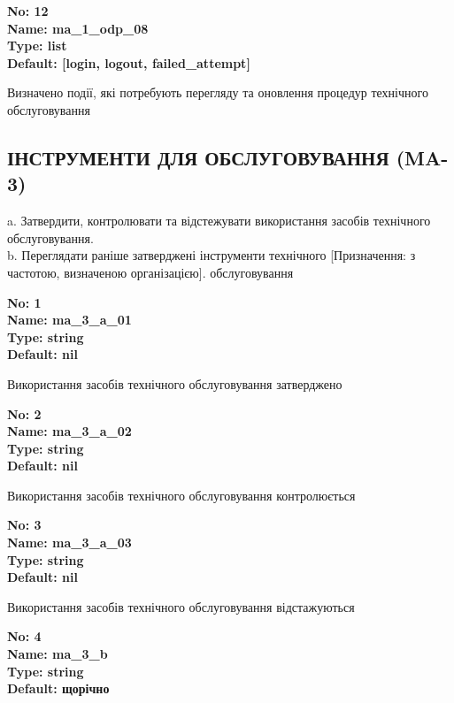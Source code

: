 \documentclass{article}
\begin{document}
{\footnotesize\bfseries
No: 12\\
Name: ma\_\allowbreak{}1\_\allowbreak{}odp\_\allowbreak{}08\\
Type: list\\
Default: [\textquotedbl{}login\textquotedbl{}, \textquotedbl{}logout\textquotedbl{}, \textquotedbl{}failed\_\allowbreak{}attempt\textquotedbl{}]
}

{\footnotesize Визначено події, які потребують перегляду та оновлення процедур технічного обслуговування}




\subsection{ІНСТРУМЕНТИ ДЛЯ ОБСЛУГОВУВАННЯ (MA-3)}
a. Затвердити, контролювати та відстежувати використання засобів технічного обслуговування.\\ 
b. Переглядати раніше затверджені інструменти технічного [Призначення: з частотою, визначеною організацією]. обслуговування

\vspace{10pt}
{\footnotesize\bfseries
No: 1\\
Name: ma\_\allowbreak{}3\_\allowbreak{}a\_\allowbreak{}01\\
Type: string\\
Default: nil
}

{\footnotesize Використання засобів технічного обслуговування затверджено}


{\footnotesize\bfseries
No: 2\\
Name: ma\_\allowbreak{}3\_\allowbreak{}a\_\allowbreak{}02\\
Type: string\\
Default: nil
}

{\footnotesize Використання засобів технічного обслуговування контролюється}


{\footnotesize\bfseries
No: 3\\
Name: ma\_\allowbreak{}3\_\allowbreak{}a\_\allowbreak{}03\\
Type: string\\
Default: nil
}

{\footnotesize Використання засобів технічного обслуговування відстажуються}


{\footnotesize\bfseries
No: 4\\
Name: ma\_\allowbreak{}3\_\allowbreak{}b\\
Type: string\\
Default: \textquotedbl{}щорічно\textquotedbl{}
}
\end{document}
